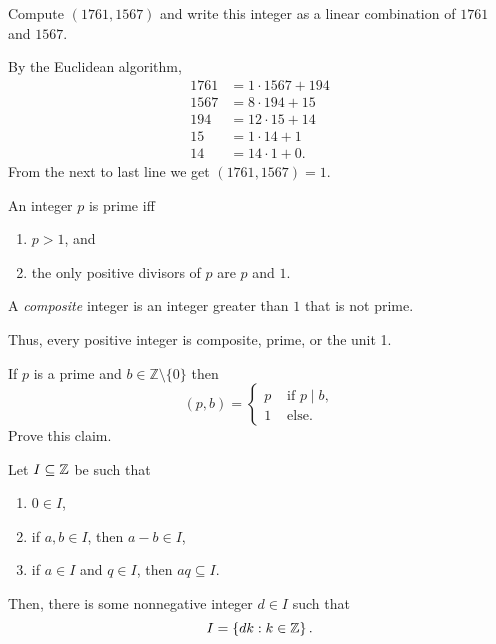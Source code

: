 \documentclass[11pt,a4paper]{article}
\begin{document}
\begin{eje}
    Compute \((1761, 1567)\) and write this integer as a linear combination of \(1761\) and \(1567\).
\end{eje}

\begin{sol} By the Euclidean algorithm,
   \begin{align*}
    1761 &= 1\cdot 1567 + 194\\
    1567 &= 8\cdot194 + 15\\
    194  &= 12\cdot 15 + 14\\
    15   &= 1\cdot 14 + 1 \\
    14   &= 14\cdot 1 + 0.
   \end{align*}
   From the next to last line we get \((1761,1567) = 1\).
\end{sol}

\begin{defi}
    An integer \(p\) is prime iff 
    \begin{enumerate}[label=(\roman*)]
        \item \(p>1\), and
        \item the only positive divisors of \(p\) are \(p\) and \(1\).
    \end{enumerate}
    A \textit{composite} integer is an integer greater than \(1\) that is not prime.
\end{defi}

Thus, every positive integer is composite, prime, or the unit 1.

\begin{rem}\label{rmk:gcd.of.prime.and.integer}
    If $p$ is a prime and $b \in \mathbb{Z}\setminus \{0\}$ then
\[
(p, b)= \begin{cases}p & \text { if } p \mid b, \\ 1 & \text { else.}\end{cases}
\]
Prove this claim.
\end{rem}

\begin{prop}
    Let \(I\subseteq \mathbb{Z}\) be such that 
    \begin{enumerate}[label=(\roman*)]
        \item\label{lab:i.exercise.ideal.of.Z} \(0\in I\),
        \item\label{lab:ii.exercise.ideal.of.Z} if  \(a,b\in I\), then \(a-b\in I\), 
        \item\label{lab:iii.exercise.ideal.of.Z} if \(a\in I\) and \(q\in I\), then  \(aq\subseteq I\).
    \end{enumerate}
    Then, there is some nonnegative integer \(d\in I\) such that  \[I = \left\{ dk: k \in \mathbb{Z} \right\}.\]
\end{prop}
\end{document}

